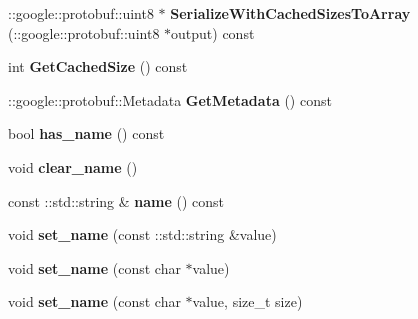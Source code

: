 \begin{DoxyCompactItemize}
\item 
\hypertarget{classSimpleChat_1_1UserJoinRequest_a878da632abfb31d553d1b400b8f45a52}{\-::google\-::protobuf\-::uint8 $\ast$ {\bfseries Serialize\-With\-Cached\-Sizes\-To\-Array} (\-::google\-::protobuf\-::uint8 $\ast$output) const }\label{classSimpleChat_1_1UserJoinRequest_a878da632abfb31d553d1b400b8f45a52}

\item 
\hypertarget{classSimpleChat_1_1UserJoinRequest_a2b55ab3707e95fef478dbb684b170f1a}{int {\bfseries Get\-Cached\-Size} () const }\label{classSimpleChat_1_1UserJoinRequest_a2b55ab3707e95fef478dbb684b170f1a}

\item 
\hypertarget{classSimpleChat_1_1UserJoinRequest_a6d8bf1219cb5c587c2a4950895bfa0b5}{\-::google\-::protobuf\-::\-Metadata {\bfseries Get\-Metadata} () const }\label{classSimpleChat_1_1UserJoinRequest_a6d8bf1219cb5c587c2a4950895bfa0b5}

\item 
\hypertarget{classSimpleChat_1_1UserJoinRequest_a66d93d16639994f13157c9481451149b}{bool {\bfseries has\-\_\-name} () const }\label{classSimpleChat_1_1UserJoinRequest_a66d93d16639994f13157c9481451149b}

\item 
\hypertarget{classSimpleChat_1_1UserJoinRequest_a946ed8a97f22650e2880c26937f568b1}{void {\bfseries clear\-\_\-name} ()}\label{classSimpleChat_1_1UserJoinRequest_a946ed8a97f22650e2880c26937f568b1}

\item 
\hypertarget{classSimpleChat_1_1UserJoinRequest_a2982525dab4154b478bbec8e2e683bf7}{const \-::std\-::string \& {\bfseries name} () const }\label{classSimpleChat_1_1UserJoinRequest_a2982525dab4154b478bbec8e2e683bf7}

\item 
\hypertarget{classSimpleChat_1_1UserJoinRequest_a5eae1adb16b9eece46618eff667a4c90}{void {\bfseries set\-\_\-name} (const \-::std\-::string \&value)}\label{classSimpleChat_1_1UserJoinRequest_a5eae1adb16b9eece46618eff667a4c90}

\item 
\hypertarget{classSimpleChat_1_1UserJoinRequest_a4e28515fad8e2d4880ded647c8f85ca3}{void {\bfseries set\-\_\-name} (const char $\ast$value)}\label{classSimpleChat_1_1UserJoinRequest_a4e28515fad8e2d4880ded647c8f85ca3}

\item 
\hypertarget{classSimpleChat_1_1UserJoinRequest_a32515a7988d42d11d0892bfbf265a0f0}{void {\bfseries set\-\_\-name} (const char $\ast$value, size\-\_\-t size)}\label{classSimpleChat_1_1UserJoinRequest_a32515a7988d42d11d0892bfbf265a0f0}


\end{DoxyCompactItemize}
